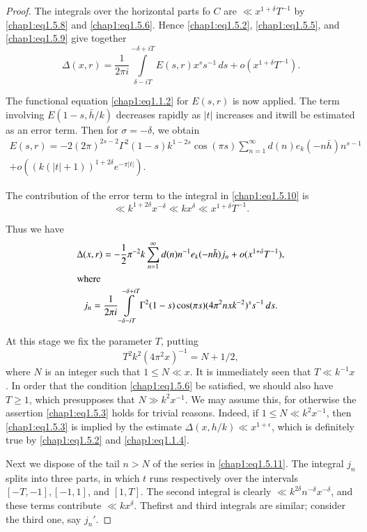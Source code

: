 \begin{proof}
The integrals over the horizontal parts fo $C$ are $\ll
x^{1+\delta} T^{-1}$ by \eqref{chap1:eq1.5.8} and
\eqref{chap1:eq1.5.6}. Hence \eqref{chap1:eq1.5.2},
\eqref{chap1:eq1.5.5}, and \eqref{chap1:eq1.5.9} give together 
\begin{equation}\label{chap1:eq1.5.10}
\Delta(x,r)=\frac{1}{2\pi i}\int\limits_{\delta-iT}^{-\delta+iT}
E(s,r)x^s s^{-1}\,ds +o(x^{1+\delta} T^{-1}). 
\end{equation}

The functional equation \eqref{chap1:eq1.1.2} for $E(s,r)$ is now
applied. The term involving $E(1-s,\bar{h}/k)$ decreases rapidly as
$|t|$ increases and it\pageoriginale will be estimated as an error
term. Then for $\sigma =-\delta$, we obtain 
\begin{gather*}
E(s,r)=-2(2\pi)^{2s-2} \Gamma^2(1-s)k^{1-2s}\cos(\pi s)
\sum\limits_{n=1}^\infty d(n)e_k(-n\bar{h})n^{s-1}\\  
+o((k(|t|+1))^{1+2\delta}e^{-\pi|t|}).
\end{gather*}

The contribution of the error term to the integral in
\eqref{chap1:eq1.5.10} is 
$$
\ll k^{1+2\delta}x^{-\delta}\ll kx^\delta \ll x^{1+\delta}T^{-1}.
$$

Thus we have 
\begin{gather}
\Delta(x,r)=-\frac{1}{2}\pi^{-2}k\sum\limits_{n=1}^\infty
d(n)n^{-1}e_k(-n\bar{h})j_n+o(x^{1+\delta}
T^{-1}),\label{chap1:eq1.5.11}\\ 
\intertext{where}
j_n=\frac{1}{2\pi i}\int\limits_{-\delta-iT}^{-\delta+iT}\Gamma^2
(1-s)\cos(\pi s)(4\pi^2nxk^{-2})^s s^{-1} \,ds.\label{chap1:eq1.5.12} 
\end{gather}

At this stage we fix the parameter $T$, putting 
\begin{equation}\label{chap1:eq1.5.13}
T^2k^2(4\pi^2x)^{-1}=N+1/2,
\end{equation}
where $N$ is an integer such that $1\leq N\ll x$. It is immediately
seen that $T\ll k^{-1}x$. In order that the condition
\eqref{chap1:eq1.5.6} be satisfied, we should also have $T\geq 1$,
which presupposes that $N\gg k^2x^{-1}$. We may assume this, for
otherwise the assertion \eqref{chap1:eq1.5.3} holds for trivial
reasons. Indeed, if $1\leq N\ll k^2x^{-1}$, then \eqref{chap1:eq1.5.3}
is implied by the estimate $\Delta(x,h/k)\ll x^{1+\epsilon}$, which is
definitely true by \eqref{chap1:eq1.5.2} and \eqref{chap1:eq1.1.4}.

Next we dispose of the tail $n>N$ of the series in
\eqref{chap1:eq1.5.11}. The integral $j_n$ splits into three parts, in
which $t$ runs respectively over the intervals $[-T,-1],[-1,1]$, and
$[1,T]$. The second integral is clearly $\ll k^{2\delta}n^{-\delta}
x^{-\delta}$, and these terms contribute $\ll
kx^\delta$. The\pageoriginale first and third integrals are similar;
consider the third one, say $j_n'$.


\end{proof}
